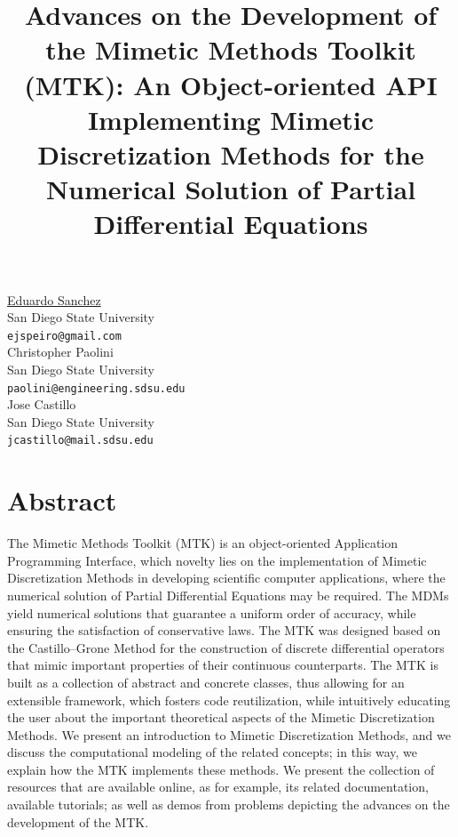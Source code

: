\documentclass[article,A4,11pt]{llncs}%
\begin{document}
\title{Advances on the Development of the Mimetic Methods Toolkit (MTK): An Object-oriented API Implementing Mimetic Discretization Methods for the Numerical Solution of Partial Differential Equations}
 \author{} \institute{}
\maketitle
\begin{center}
{\large \underline{Eduardo Sanchez}}\\
San Diego State University\\
{\tt ejspeiro@gmail.com}
\\ \vspace{4mm}
{\large Christopher Paolini}\\
San Diego State University\\
{\tt paolini@engineering.sdsu.edu}
\\ \vspace{4mm}
{\large Jose Castillo}\\
San Diego State University\\
{\tt jcastillo@mail.sdsu.edu}
\end{center}

\section*{Abstract}
The  Mimetic Methods Toolkit (MTK) is an object-oriented Application Programming Interface, which novelty lies on the implementation of Mimetic Discretization Methods in developing scientific computer applications, where the numerical solution of Partial Differential Equations may be required. The MDMs yield numerical solutions that guarantee a uniform order of accuracy, while ensuring the satisfaction of conservative laws. The MTK was designed based on the Castillo–Grone Method for the construction of discrete differential operators that mimic important properties of their continuous counterparts. The MTK is built as a collection of abstract and concrete classes, thus allowing for an extensible framework, which fosters code reutilization, while intuitively educating the user about the important theoretical aspects of the Mimetic Discretization Methods. We present an introduction to Mimetic Discretization Methods, and we discuss the computational modeling of the related concepts; in this way, we explain how the MTK implements these methods. We present the collection of resources that are available online, as for example, its related documentation, available tutorials; as well as demos from problems depicting the advances on the development of the MTK.
\end{document}

